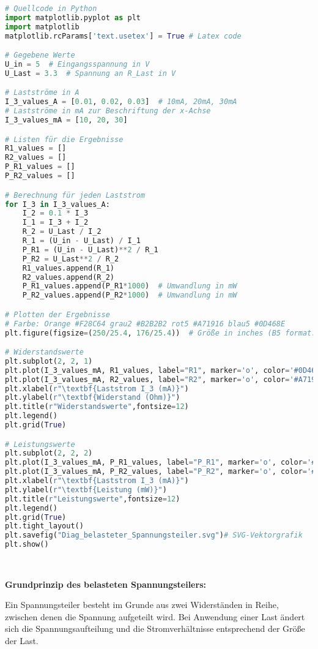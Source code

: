 \documentclass[12pt,a4paper]{scrartcl}
\begin{document}
\begin{lstlisting}[language=Python]
# Quellcode in Python
import matplotlib.pyplot as plt
import matplotlib 
matplotlib.rcParams['text.usetex'] = True # Latex code

# Gegebene Werte
U_in = 5  # Eingangsspannung in V
U_Last = 3.3  # Spannung an R_Last in V

# Lastströme in A
I_3_values_A = [0.01, 0.02, 0.03]  # 10mA, 20mA, 30mA
# Lastströme in mA zur Beschriftung der x-Achse
I_3_values_mA = [10, 20, 30]

# Listen für die Ergebnisse
R1_values = []
R2_values = []
P_R1_values = []
P_R2_values = []

# Berechnung für jeden Laststrom
for I_3 in I_3_values_A:
    I_2 = 0.1 * I_3
    I_1 = I_3 + I_2 
    R_2 = U_Last / I_2
    R_1 = (U_in - U_Last) / I_1
    P_R1 = (U_in - U_Last)**2 / R_1
    P_R2 = U_Last**2 / R_2
    R1_values.append(R_1)
    R2_values.append(R_2)
    P_R1_values.append(P_R1*1000)  # Umwandlung in mW
    P_R2_values.append(P_R2*1000)  # Umwandlung in mW

# Plotten der Ergebnisse
# Farbe: Orange #F28C64 grau2 #B2B2B2 rot5 #A71916 blau5 #0D468E
plt.figure(figsize=(250/25.4, 176/25.4))  # Größe in inches (B5 format: 250mm x 176mm)

# Widerstandswerte
plt.subplot(2, 2, 1)
plt.plot(I_3_values_mA, R1_values, label="R1", marker='o', color='#0D468E')
plt.plot(I_3_values_mA, R2_values, label="R2", marker='o', color='#A71916')
plt.xlabel(r"\textbf{Laststrom I_3 (mA)}")
plt.ylabel(r"\textbf{Widerstand (Ohm)}")
plt.title(r"Widerstandswerte",fontsize=12)
plt.legend()
plt.grid(True)

# Leistungswerte
plt.subplot(2, 2, 2)
plt.plot(I_3_values_mA, P_R1_values, label="P_R1", marker='o', color='#0D468E')
plt.plot(I_3_values_mA, P_R2_values, label="P_R2", marker='o', color='#A71916')
plt.xlabel(r"\textbf{Laststrom I_3 (mA)}")
plt.ylabel(r"\textbf{Leistung (mW)}")
plt.title(r"Leistungswerte",fontsize=12)
plt.legend()
plt.grid(True)
plt.tight_layout()
plt.savefig("Diag_belasteter_Spannungsteiler.svg")# SVG-Vektorgrafik
plt.show()
\end{lstlisting}

\\

\newpage

\textbf{Grundprinzip des belasteten Spannungsteilers:}

Ein Spannungsteiler besteht im Grunde aus zwei Widerständen in Reihe,
zwischen denen die Spannung aufgeteilt wird. Bei Anwendung einer Last
ändert sich die Spannungsaufteilung und die Stromverhältnisse
entsprechend der Größe der Last.
\end{document}
